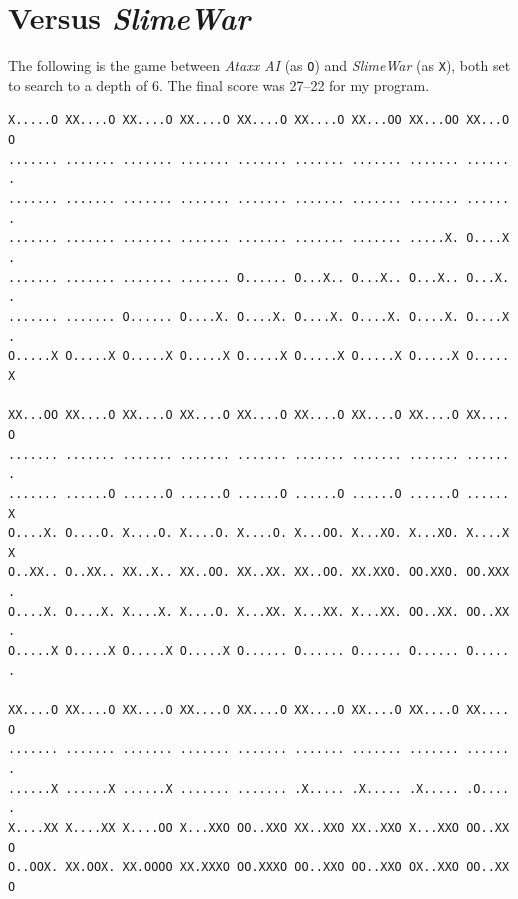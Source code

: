 \documentclass[12pt]{article}
\newcommand{\X}{\texttt{X}}
\renewcommand{\O}{\texttt{O}}
\begin{document}
\section{Versus \textsl{SlimeWar}}
The following is the game between \textsl{Ataxx AI} (as \O) and \textsl{SlimeWar} (as \X), both set to search to a depth of 6.  The final score was 27--22 for my program.
\begin{center}\texttt{X.....O~XX....O~XX....O~XX....O~XX....O~XX....O~XX...OO~XX...OO~XX...OO~\\
.......~.......~.......~.......~.......~.......~.......~.......~.......~\\
.......~.......~.......~.......~.......~.......~.......~.......~.......~\\
.......~.......~.......~.......~.......~.......~.......~.....X.~O....X.~\\
.......~.......~.......~.......~O......~O...X..~O...X..~O...X..~O...X..~\\
.......~.......~O......~O....X.~O....X.~O....X.~O....X.~O....X.~O....X.~\\
O.....X~O.....X~O.....X~O.....X~O.....X~O.....X~O.....X~O.....X~O.....X~\\
~\\
XX...OO~XX....O~XX....O~XX....O~XX....O~XX....O~XX....O~XX....O~XX....O~\\
.......~.......~.......~.......~.......~.......~.......~.......~.......~\\
.......~......O~......O~......O~......O~......O~......O~......O~......X~\\
O....X.~O....O.~X....O.~X....O.~X....O.~X...OO.~X...XO.~X...XO.~X....XX~\\
O..XX..~O..XX..~XX..X..~XX..OO.~XX..XX.~XX..OO.~XX.XXO.~OO.XXO.~OO.XXX.~\\
O....X.~O....X.~X....X.~X....O.~X...XX.~X...XX.~X...XX.~OO..XX.~OO..XX.~\\
O.....X~O.....X~O.....X~O.....X~O......~O......~O......~O......~O......~\\
~\\\pagebreak
XX....O~XX....O~XX....O~XX....O~XX....O~XX....O~XX....O~XX....O~XX....O~\\
.......~.......~.......~.......~.......~.......~.......~.......~.......~\\
......X~......X~......X~.......~.......~.X.....~.X.....~.X.....~.O.....~\\
X....XX~X....XX~X....OO~X...XXO~OO..XXO~XX..XXO~XX..XXO~X...XXO~OO..XXO~\\
O..OOX.~XX.OOX.~XX.OOOO~XX.XXXO~OO.XXXO~OO..XXO~OO..XXO~OX..XXO~OO..XXO~\\
}
\end{center}
\end{document}
